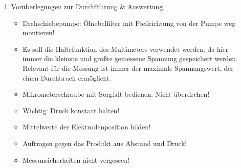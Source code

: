 \documentclass{article}
\begin{document}
\begin{enumerate}[label = (\Roman*)]
    \item Vorüberlegungen zur Durchführung \& Auswertung
        \begin{itemize}
             \item Drehschiebepumpe: Ölnebelfilter mit Pfeilrichtung von der Pumpe weg montieren!
             \item Es soll die Haltefunktion des Multimeters verwendet werden, da hier immer die kleinste und größte gemessene Spannung gespeichert werden. Relevant für die Messung ist immer der maximale Spannungswert, der einen Durchbruch ermöglicht.
             \item Mikrometerschraube mit Sorgfalt bedienen. Nicht überdrehen!
             \item Wichtig: Druck konstant halten!
             \item Mittelwerte der Elektrodenposition bilden!
             \item Auftragen gegen das Produkt aus Abstand und Druck!
             \item Messunsicherheiten nicht vergessen!
        \end{itemize}
    
\end{enumerate}

\newpage
\end{document}
